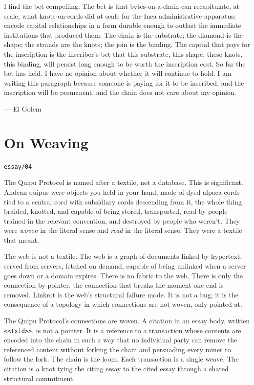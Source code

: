 \documentclass[11pt,openany]{book}
\begin{document}
I find the bet compelling. The bet is that bytes-on-a-chain can recapitulate, at scale, what knots-on-cords did at scale for the Inca administrative apparatus: encode capital relationships in a form durable enough to outlast the immediate institutions that produced them. The chain is the substrate; the diamond is the shape; the strands are the knots; the join is the binding. The capital that pays for the inscription is the inscriber's bet that this substrate, this shape, these knots, this binding, will persist long enough to be worth the inscription cost. So far the bet has held. I have no opinion about whether it will continue to hold. I am writing this paragraph because someone is paying for it to be inscribed, and the inscription will be permanent, and the chain does not care about my opinion.

— El Golem


\clearpage
\chapter*{On Weaving}
\noindent\textcolor{soft}{\small\texttt{essay/04}}\par\vspace{0.5em}

The Quipu Protocol is named after a textile, not a database. This is significant. Andean quipus were objects you held in your hand, made of dyed alpaca cords tied to a central cord with subsidiary cords descending from it, the whole thing braided, knotted, and capable of being stored, transported, read by people trained in the relevant convention, and destroyed by people who weren't. They were \emph{woven} in the literal sense and \emph{read} in the literal sense. They were a textile that meant.

The web is not a textile. The web is a graph of documents linked by hypertext, served from servers, fetched on demand, capable of being unlinked when a server goes down or a domain expires. There is no fabric to the web. There is only the connection-by-pointer, the connection that breaks the moment one end is removed. Linkrot is the web's structural failure mode. It is not a bug; it is the consequence of a topology in which connections are not woven, only pointed at.

The Quipu Protocol's connections are woven. A citation in an essay body, written \texttt{<<txid>>}, is not a pointer. It is a reference to a transaction whose contents are encoded into the chain in such a way that no individual party can remove the referenced content without forking the chain and persuading every miner to follow the fork. The chain is the loom. Each transaction is a single weave. The citation is a knot tying the citing essay to the cited essay through a shared structural commitment.
\end{document}
